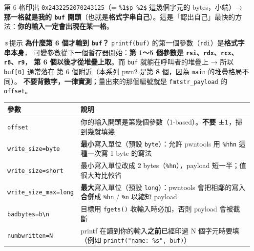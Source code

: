 \documentclass[10pt,a4paper]{article}
\newcounter{none}
\renewenvironment{quote}{%
  \begin{mdframed}[linewidth=0pt,innerleftmargin=0pt,innerrightmargin=0pt,
    innerbottommargin=0pt,innertopmargin=0pt,skipabove=0.55em,skipbelow=0.55em,
    leftmargin=0.9em,rightmargin=0.4em,startcode={\color{quotebar}\vrule width 2.6pt},%
    endcode={}]%
  \itshape\color{black}%
}{%
  \end{mdframed}%
}
\begin{document}
第 6 格印出 \texttt{0x2432252070243125}（= \texttt{\%\allowbreak{}1\$\allowbreak{}p\ \allowbreak{}\%\allowbreak{}2\$\allowbreak{}}
這幾個字元的 bytes，小端）→ \textbf{那一格就是我的 \texttt{buf}
開頭}（也就是\textbf{格式字串自己}）。這是「認出自己」最快的方法：\textbf{你的輸入一定會出現在某一格}。

\begin{quote}
※提示 \textbf{為什麼第 6 個才輪到 \texttt{buf}？} \texttt{printf(buf)}
的第一個參數（\texttt{rdi}）是\textbf{格式字串本身}，
可變參數從下一個暫存器開始：\textbf{第 1～5 個參數是
\texttt{rsi}、\texttt{rdx}、\texttt{rcx}、\texttt{r8}、\texttt{r9}}，
\textbf{第 6 個以後才從堆疊上取}。而 \texttt{buf} 就躺在呼叫者的堆疊上 →
所以 \texttt{buf{[}0{]}} 通常落在 第 6 個附近（本系列 pwn2 是第
\textbf{8} 個，因為 \texttt{main} 的堆疊格局不同）。
\textbf{不要背數字，一律實測}；量出來的那個編號就是
\texttt{fmtstr\_\allowbreak{}payload} 的 \texttt{offset}。
\end{quote}

{\def\LTcaptype{none} %
\begin{longtable}[]{@{}
  >{\raggedright\arraybackslash}p{}
  >{\raggedright\arraybackslash}p{}@{}}
\toprule\noalign{}
\begin{minipage}[b]{\linewidth}\raggedright
參數
\end{minipage} & \begin{minipage}[b]{\linewidth}\raggedright
說明
\end{minipage} \\
\midrule\noalign{}
\endhead
\bottomrule\noalign{}
\endlastfoot
\texttt{offset} & 你的輸入開頭是第幾個參數（1-based）。\textbf{不要
±1}，掃到幾就填幾 \\
\texttt{write\_\allowbreak{}size=\textquotesingle{}\allowbreak{}byte\textquotesingle{}\allowbreak{}} &
\textbf{最小}寫入單位（預設
\texttt{\textquotesingle{}\allowbreak{}byte\textquotesingle{}\allowbreak{}}）：允許 pwntools 用
\texttt{\%\allowbreak{}hhn} 這種一次寫 1 byte 的寫法 \\
\texttt{write\_\allowbreak{}size=\textquotesingle{}\allowbreak{}short\textquotesingle{}\allowbreak{}} &
最小寫入單位改成 2 bytes（\texttt{\%\allowbreak{}hn}），payload
短一半；值很大時比較省 \\
\texttt{write\_\allowbreak{}size\_\allowbreak{}max=\textquotesingle{}\allowbreak{}long\textquotesingle{}\allowbreak{}} &
\textbf{最大}寫入單位（預設
\texttt{\textquotesingle{}\allowbreak{}long\textquotesingle{}\allowbreak{}}）：pwntools
會把相鄰的寫入\textbf{合併}成 \texttt{\%\allowbreak{}hn} / \texttt{\%\allowbreak{}n} 以縮短
payload \\
\texttt{badbytes=b\textquotesingle{}\allowbreak{}\textbackslash{}\allowbreak{}n\textquotesingle{}\allowbreak{}}
& 目標用 \texttt{fgets()} 收輸入時必加，否則 payload 會被截斷 \\
\texttt{numbwritten=N} & printf 在讀到你的輸入\textbf{之前}已經印過 N
個字元時要填（例如 \texttt{printf("name:\allowbreak{}\ \allowbreak{}\%\allowbreak{}s",\allowbreak{}\ \allowbreak{}buf)}） \\
\end{longtable}
}
\end{document}
